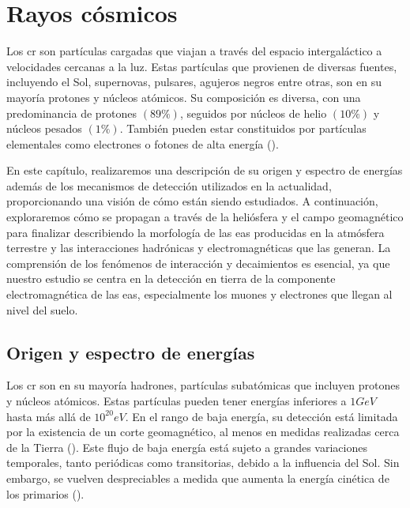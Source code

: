 \newpage
\chapter{Rayos cósmicos}
Los \gls{cr} son partículas cargadas que viajan a través del espacio intergaláctico a velocidades cercanas a la luz. Estas partículas que provienen de diversas fuentes, incluyendo el Sol, supernovas, pulsares, agujeros negros entre otras, son en su mayoría protones y núcleos atómicos. Su composición es diversa, con una predominancia de protones $(89\%)$, seguidos por núcleos de helio $( 10\%)$ y núcleos pesados $( 1\%)$. También pueden estar constituidos por partículas elementales como electrones o fotones de alta energía  (\cite{kampert_2012}). 

En este capítulo, realizaremos una descripción de su origen y espectro de energías además de los mecanismos de detección utilizados en la actualidad, proporcionando una visión de cómo están siendo estudiados.  A continuación, exploraremos cómo se propagan a través de la heliósfera y el campo geomagnético para finalizar describiendo la morfología de las \gls{eas} producidas en la atmósfera terrestre y las interacciones hadrónicas y electromagnéticas que las generan. La comprensión de los fenómenos de interacción y decaimientos es esencial, ya que nuestro estudio se centra en la detección en tierra de la componente electromagnética de las \gls{eas}, especialmente los muones y electrones que llegan al nivel del suelo. 

\section{Origen y espectro de energías}

Los \gls{cr} son en su mayoría hadrones, partículas subatómicas que incluyen protones y núcleos atómicos. Estas partículas pueden tener energías inferiores a $1 GeV$ hasta más allá de $10^{20} eV$.  En el rango de baja energía, su detección está limitada por la existencia de un corte geomagnético, al menos en medidas realizadas cerca de la Tierra (\cite{Riggi_2023}). Este flujo de baja energía está sujeto a grandes variaciones temporales, tanto periódicas como transitorias, debido a la influencia del Sol. Sin embargo, se vuelven despreciables a medida que aumenta la energía cinética de los primarios (\cite{spurio_2015}).

